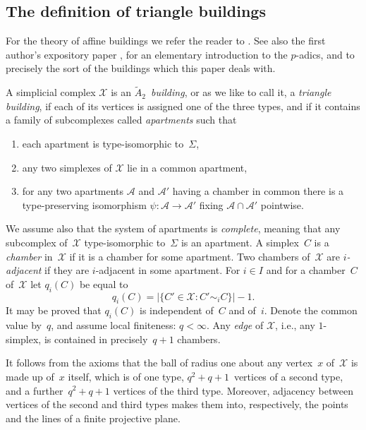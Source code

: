 \documentclass[a4paper]{amsart}
\newcommand{\defn}[1]{\emph{#1}}
\newcommand{\abs}[1]{{\lvert {#1} \rvert}}
\theoremstyle{plain}
\theoremstyle{definition}
\theoremstyle{remark}
\numberwithin{equation}{section}
\theoremstyle{plain}
\begin{document}
\subsection{The definition of triangle buildings}
For the theory of affine buildings we refer the reader to \cite{ron}. 
See also the first author's expository paper \cite{st-b}, for an elementary introduction to the $p$-adics,
and to precisely the sort of the buildings which this paper deals with.

A simplicial complex
$\mathscr{X}$ is an \defn{$\tilde A_2$~building}, or as we like to call it, a
\defn{triangle building}, if each of its vertices is assigned one of the three types, and if
it contains a family of subcomplexes called {\em apartments} such that
\begin{enumerate}
  \item each apartment is type-isomorphic to~$\Sigma$,
  \item any two simplexes of $\mathscr{X}$ lie in a common apartment,
  \item\label{axiom3} for any two apartments $\mathscr{A}$ and
    $\mathscr{A}'$ having a chamber in common there is a
    type-preserving isomorphism $\psi: \mathscr{A} \rightarrow
    \mathscr{A}'$ fixing $\mathscr{A} \cap \mathscr{A}'$ pointwise.
\end{enumerate}
We assume also that the system of apartments is \defn{complete},
meaning that any subcomplex of~$\mathscr{X}$ type-isomorphic
to~$\Sigma$ is an apartment.  A simplex~$C$ is a \defn{chamber}
in~$\mathscr{X}$ if it is a chamber for some apartment. Two chambers
of~$\mathscr{X}$ are \defn{$i$-adjacent} if they are $i$-adjacent in
some apartment. For $i\in I$ and for a chamber~$C$ of~$\mathscr{X}$
let $q_i(C)$ be equal to
\begin{equation*}
	q_i(C) = \abs{\{C' \in \mathscr{X}: C' \sim_i C\}} - 1.
\end{equation*}
It may be proved that $q_i(C)$ is independent of~$C$ and
of~$i$. Denote the common value by~$q$, and assume local finiteness:
$q<\infty$.  Any \emph{edge} of $\mathscr{X}$, i.e., any $1$-simplex,
is contained in precisely~$q+1$ chambers.

It follows from the axioms that the ball of radius one about any
vertex~$x$ of~$\mathscr{X}$ is made up of~$x$ itself, which is of one
type, $q^2+q+1$~vertices of a second type, and a further~$q^2+q+1$
vertices of the third type.  Moreover, adjacency between vertices of
the second and third types makes them into, respectively, the points
and the lines of a finite projective plane.
\end{document}
